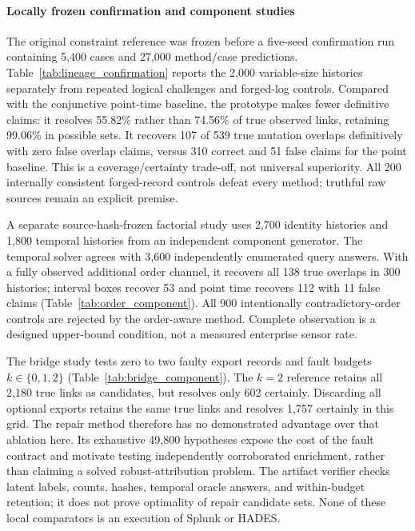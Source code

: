 \paragraph{Locally frozen confirmation and component studies}
The original constraint reference was frozen before a five-seed confirmation run containing 5,400 cases and 27,000 method/case predictions. Table~\ref{tab:lineage_confirmation} reports the 2,000 variable-size histories separately from repeated logical challenges and forged-log controls. Compared with the conjunctive point-time baseline, the prototype makes fewer definitive claims: it resolves 55.82\% rather than 74.56\% of true observed links, retaining 99.06\% in possible sets. It recovers 107 of 539 true mutation overlaps definitively with zero false overlap claims, versus 310 correct and 51 false claims for the point baseline. This is a coverage/certainty trade-off, not universal superiority. All 200 internally consistent forged-record controls defeat every method; truthful raw sources remain an explicit premise.

A separate source-hash-frozen factorial study uses 2,700 identity histories and 1,800 temporal histories from an independent component generator. The temporal solver agrees with 3,600 independently enumerated query answers. With a fully observed additional order channel, it recovers all 138 true overlaps in 300 histories; interval boxes recover 53 and point time recovers 112 with 11 false claims (Table~\ref{tab:order_component}). All 900 intentionally contradictory-order controls are rejected by the order-aware method. Complete observation is a designed upper-bound condition, not a measured enterprise sensor rate.

The bridge study tests zero to two faulty export records and fault budgets $k\in\{0,1,2\}$ (Table~\ref{tab:bridge_component}). The $k=2$ reference retains all 2,180 true links as candidates, but resolves only 602 certainly. Discarding all optional exports retains the same true links and resolves 1,757 certainly in this grid. The repair method therefore has no demonstrated advantage over that ablation here. Its exhaustive 49,800 hypotheses expose the cost of the fault contract and motivate testing independently corroborated enrichment, rather than claiming a solved robust-attribution problem. The artifact verifier checks latent labels, counts, hashes, temporal oracle answers, and within-budget retention; it does not prove optimality of repair candidate sets. None of these local comparators is an execution of Splunk or HADES.

